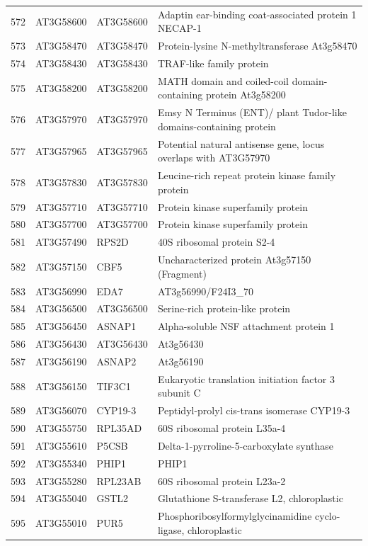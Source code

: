 \documentclass[11pt]{article}
\begin{document}
\begin{center}
\begin{tabular}{rlll}
572 & AT3G58600 & AT3G58600 & Adaptin ear-binding coat-associated protein 1 NECAP-1\\
573 & AT3G58470 & AT3G58470 & Protein-lysine N-methyltransferase At3g58470\\
574 & AT3G58430 & AT3G58430 & TRAF-like family protein\\
575 & AT3G58200 & AT3G58200 & MATH domain and coiled-coil domain-containing protein At3g58200\\
576 & AT3G57970 & AT3G57970 & Emsy N Terminus (ENT)/ plant Tudor-like domains-containing protein\\
577 & AT3G57965 & AT3G57965 & Potential natural antisense gene, locus overlaps with AT3G57970\\
578 & AT3G57830 & AT3G57830 & Leucine-rich repeat protein kinase family protein\\
579 & AT3G57710 & AT3G57710 & Protein kinase superfamily protein\\
580 & AT3G57700 & AT3G57700 & Protein kinase superfamily protein\\
581 & AT3G57490 & RPS2D & 40S ribosomal protein S2-4\\
582 & AT3G57150 & CBF5 & Uncharacterized protein At3g57150 (Fragment)\\
583 & AT3G56990 & EDA7 & AT3g56990/F24I3\_70\\
584 & AT3G56500 & AT3G56500 & Serine-rich protein-like protein\\
585 & AT3G56450 & ASNAP1 & Alpha-soluble NSF attachment protein 1\\
586 & AT3G56430 & AT3G56430 & At3g56430\\
587 & AT3G56190 & ASNAP2 & At3g56190\\
588 & AT3G56150 & TIF3C1 & Eukaryotic translation initiation factor 3 subunit C\\
589 & AT3G56070 & CYP19-3 & Peptidyl-prolyl cis-trans isomerase CYP19-3\\
590 & AT3G55750 & RPL35AD & 60S ribosomal protein L35a-4\\
591 & AT3G55610 & P5CSB & Delta-1-pyrroline-5-carboxylate synthase\\
592 & AT3G55340 & PHIP1 & PHIP1\\
593 & AT3G55280 & RPL23AB & 60S ribosomal protein L23a-2\\
594 & AT3G55040 & GSTL2 & Glutathione S-transferase L2, chloroplastic\\
595 & AT3G55010 & PUR5 & Phosphoribosylformylglycinamidine cyclo-ligase, chloroplastic\\

\end{tabular}
\end{center}
\end{document}
